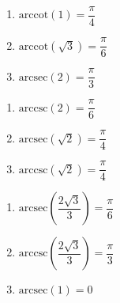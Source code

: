 \documentclass{ximera}
\begin{document}
\begin{multicols}{3} 

\begin{enumerate}

\setcounter{enumi}{\value{HW}}

\item $\mbox{arccot} \left( 1 \right) = \dfrac{\pi}{4}$
\item $\mbox{arccot} \left( \sqrt{3} \right) = \dfrac{\pi}{6}$
\item $\mbox{arcsec} \left( 2 \right) = \dfrac{\pi}{3}$

\setcounter{HW}{\value{enumi}}

\end{enumerate}

\end{multicols}

\begin{multicols}{3} 

\begin{enumerate}

\setcounter{enumi}{\value{HW}}

\item $\mbox{arccsc} \left( 2 \right) = \dfrac{\pi}{6}$
\item $\mbox{arcsec} \left( \sqrt{2} \right) = \dfrac{\pi}{4}$
\item $\mbox{arccsc} \left( \sqrt{2} \right) = \dfrac{\pi}{4}$

\setcounter{HW}{\value{enumi}}

\end{enumerate}

\end{multicols}

\begin{multicols}{3} 

\begin{enumerate}

\setcounter{enumi}{\value{HW}}

\item $\mbox{arcsec} \left( \dfrac{2\sqrt{3}}{3} \right) = \dfrac{\pi}{6}$
\item $\mbox{arccsc} \left( \dfrac{2\sqrt{3}}{3} \right) = \dfrac{\pi}{3}$
\item $\mbox{arcsec} \left( 1 \right) = 0$ 

\setcounter{HW}{\value{enumi}}

\end{enumerate}

\end{multicols}
\end{document}
